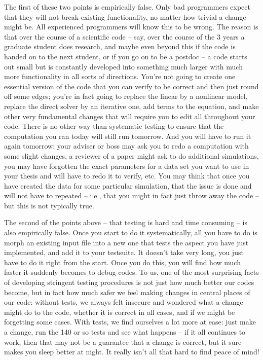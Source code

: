 \documentclass{article}
\begin{document}
The first of these two points is empirically false. Only bad programmers
expect that they will not break existing functionality, no matter how trivial
a change might be. All experienced programmers will know this to be wrong. The
reason is that over the course of a scientific code -- say, over the course of
the 3 years a graduate student does research, and maybe even beyond this if
the code is handed on to the next student, or if you go on to be a postdoc --
a code starts out small but is constantly developed into something much larger
with much more functionality in all sorts of directions. You're not going to
create one essential version of the code that you can verify to be correct and
then just round off some edges; you're in fact going to replace the linear by
a nonlinear model, replace the direct solver by an iterative one, add terms to
the equation, and make other very fundamental changes that will require you to
edit all throughout your code. There is no other way than systematic testing
to ensure that the computation you ran today will still run tomorrow. And you
will have to run it again tomorrow: your adviser or boss may ask you to redo a
computation with some slight changes, a reviewer of a paper might ask to do
additional simulations, you may have forgotten the exact parameters for a data
set you want to use in your thesis and will have to redo it to verify,
etc. You may think that once you have created the data 
for some particular simulation, that the issue is done and will not have to
repeated -- i.e., that you might in fact just throw away the code -- but this
is not typically true.

The second of the points above -- that testing is hard and time consuming --
is also empirically false. Once you start to do it systematically, all you
have to do is morph an existing input file into a new one that tests the
aspect you have just implemented, and add it to your testsuite. It doesn't
take very long, you just have to do it right from the start. Once you do this,
you will find how much faster it suddenly becomes to debug codes. To us, one
of the most surprising facts of developing stringent testing procedures is not
just how much better our codes become, but in fact how much safer we feel
making changes in central places of our code: without tests, we always felt
insecure and wondered what a change might do to the code, whether it is
correct in all cases, and if we might be forgetting some cases. With tests,
we find ourselves a lot more at ease: just make a change, run the 140 or so
tests and see what happens -- if it all continues to work, then that may not
be a guarantee that a change is correct, but it sure makes you sleep better at
night. It really isn't all that hard to find peace of mind!
\end{document}
